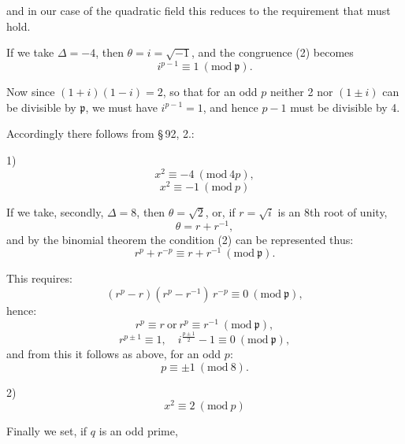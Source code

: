 
and in our case of the quadratic field this reduces to the requirement
that
must hold.

If we take $\Delta = -4$, then $\theta = i = \sqrt{-1}$, and the congruence
 (2) becomes
\[
i^{p-1} \equiv 1 \ (\mathrm{mod}\ \mathfrak{p}).
\]

Now since $(1+i)(1-i) = 2$, so that for an odd $p$ neither 2 nor
$(1 \pm i)$ can be divisible by $\mathfrak{p}$, we must have $i^{p-1} = 1$,
and hence $p - 1$ must be divisible by 4.

Accordingly there follows from \S\,92, 2.:

1) 
\[
x^2 \equiv -4 \ (\mathrm{mod}\ 4p),
\]
\[
x^2 \equiv -1 \ (\mathrm{mod}\ p)
\]

If we take, secondly, $\Delta = 8$, then $\theta = \sqrt{2}$, or, if
$r = \sqrt{i}$ is an 8th root of unity,
\[
\theta = r + r^{-1},
\]
and by the binomial theorem the condition (2) can be represented
thus:
\[
r^p + r^{-p} \equiv r + r^{-1} \ (\mathrm{mod}\ \mathfrak{p}).
\]

This requires:
\[
(r^p - r)(r^p - r^{-1})\, r^{-p} \equiv 0 \ (\mathrm{mod}\ \mathfrak{p}),
\]
hence:
\[
r^p \equiv r \ \text{or} \ r^p \equiv r^{-1} \ (\mathrm{mod}\ \mathfrak{p}),
\]
\[
r^{p \pm 1} \equiv 1, \quad i^{\frac{p \pm 1}{2}} - 1 \equiv 0 \ (\mathrm{mod}\ \mathfrak{p}),
\]
and from this it follows as above, for an odd $p$:
\[
p \equiv \pm 1 \ (\mathrm{mod}\ 8).
\]

2) 
\[
x^2 \equiv 2 \ (\mathrm{mod}\ p)
\]

Finally we set, if $q$ is an odd prime,
